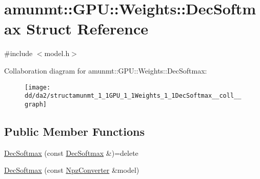 \hypertarget{structamunmt_1_1GPU_1_1Weights_1_1DecSoftmax}{}\section{amunmt\+:\+:G\+PU\+:\+:Weights\+:\+:Dec\+Softmax Struct Reference}
\label{structamunmt_1_1GPU_1_1Weights_1_1DecSoftmax}


{\ttfamily \#include $<$model.\+h$>$}



Collaboration diagram for amunmt\+:\+:G\+PU\+:\+:Weights\+:\+:Dec\+Softmax\+:
\nopagebreak
\begin{figure}[H]
\begin{center}
\leavevmode
\texttt{[image: dd/da2/structamunmt\_1\_1GPU\_1\_1Weights\_1\_1DecSoftmax\_\_coll\_\_graph]}
\end{center}
\end{figure}
\subsection*{Public Member Functions}
\begin{DoxyCompactItemize}
\item 
\hyperlink{structamunmt_1_1GPU_1_1Weights_1_1DecSoftmax_a80bb6811c9be1b595b82bc114608f96c}{Dec\+Softmax} (const \hyperlink{structamunmt_1_1GPU_1_1Weights_1_1DecSoftmax}{Dec\+Softmax} \&)=delete
\item 
\hyperlink{structamunmt_1_1GPU_1_1Weights_1_1DecSoftmax_afd51921b11fd271efb052a1a35193ba7}{Dec\+Softmax} (const \hyperlink{classamunmt_1_1GPU_1_1NpzConverter}{Npz\+Converter} \&model)
\end{DoxyCompactItemize}
